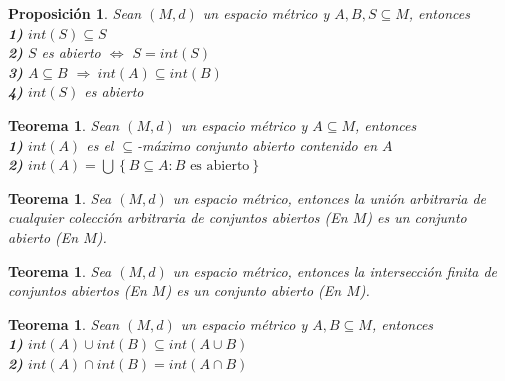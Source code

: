 \documentclass[oneside]{book} %
\theoremstyle{Teorema}
\newtheorem{Teorema}[Definicion]{Teorema}
\newtheorem{Proposicion}[Definicion]{Proposición}
\theoremstyle{Ejemplos}
\theoremstyle{[Obs]}
\renewcommand{\{}{\left\lbrace} %
\renewcommand{\}}{\right\rbrace} %
\renewcommand{\u}{\cup} %
\newcommand{\n}{\cap} %
\newcommand{\U}{\bigcup} %
\renewcommand{\sc}{\subseteq} %
\newcommand{\Imp}{$\Rightarrow\ $} %
\begin{document}
			\begin{Proposicion}
				
				Sean $(M, d)$ un espacio métrico y $A, B, S \sc M$, entonces \\

				\textbf{1)} $int(S) \sc S$ \\

				\textbf{2)} $S$ es abierto $\Leftrightarrow$ $S = int(S)$ \\

				\textbf{3)} $A \sc B$ \Imp $int(A) \sc int(B)$ \\

				\textbf{4)} $int(S)$ es abierto \\

			\end{Proposicion}

			\begin{Teorema}
				
				Sean $(M, d)$ un espacio métrico y $A \sc M$, entonces \\
				
				\textbf{1)} $int(A)$ es el $\sc$-máximo conjunto abierto contenido en $A$ \\

				\textbf{2)} $int(A) = \U\{ B \sc A : B \text{ es abierto} \}$ \\

			\end{Teorema}


			\begin{Teorema}

				Sea $(M, d)$ un espacio métrico, entonces la unión arbitraria de cualquier colección arbitraria de conjuntos abiertos (En $M$) es un conjunto abierto (En $M$). \\

			\end{Teorema}

			\begin{Teorema}

				Sea $(M, d)$ un espacio métrico, entonces la intersección finita de conjuntos abiertos (En $M$) es un conjunto abierto (En $M$). \\

			\end{Teorema}

			\begin{Teorema}
				
				Sean $(M, d)$ un espacio métrico y $A, B \sc M$, entonces \\

				\textbf{1)} $int(A) \u int(B) \sc int(A \u B)$ \\

				\textbf{2)} $int(A) \n int(B) = int(A \n B)$ \\

			\end{Teorema}
\end{document}
